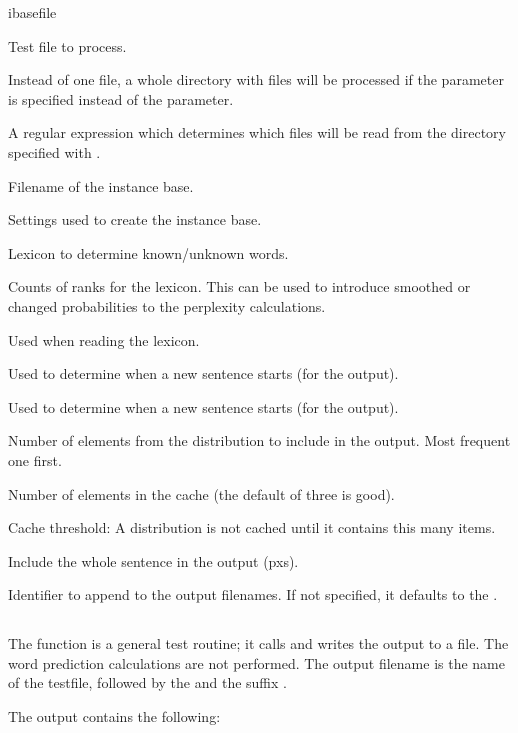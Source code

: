 \documentclass[a4paper,10pt,twoside]{report}
\begin{document}
\begin{varlist}{ibasefile}
\item[filename] Test file to process.
\item[dir] Instead of one file, a whole directory with files will be
  processed if the  parameter is specified instead of the
   parameter.
\item[dirmatch] A regular expression which determines which files will
  be read from the directory specified with .
\item[ibasefile] Filename of the instance base.
\item[timbl] Settings used to create the instance base.
\item[lexicon] Lexicon to determine known/unknown words.
\item[counts] Counts of ranks for the lexicon. This can be used to
  introduce smoothed or changed probabilities to the perplexity
  calculations. 
\item[hapax] Used when reading the lexicon.
\item[lc] Used to determine when a new sentence starts (for the
   output).
\item[rc] Used to determine when a new sentence starts (for the
   output). 
\item[topn] Number of elements from the \Timbl{} distribution to
  include in the output. Most frequent one first.
\item[cache] Number of elements in the cache (the default of three is
  good). 
\item[cth] Cache threshold: A distribution is not cached until it
  contains this many items.
\item[is] Include the whole sentence in the output (pxs).
\item[id] Identifier to append to the output filenames. If not
  specified, it defaults to the \pid{}.
\end{varlist}

\subsection{}

The  function is a general test routine; it calls \Timbl{} and
writes the output to a file. The word prediction calculations are not
performed. The output filename is the name of the testfile, followed
by the  and the suffix .

The output contains the following:
\end{document}
